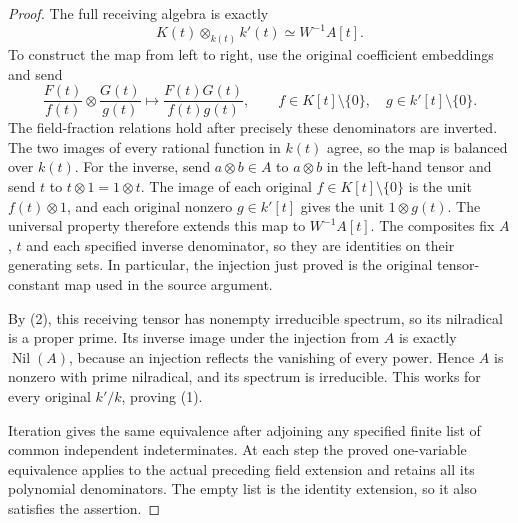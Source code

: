 \begin{proof}
The full receiving algebra is
exactly
$$
K(t)\otimes_{k(t)}k'(t)\simeq W^{-1}A[t].
$$
To construct the map from left
to right, use the original
coefficient embeddings and send
$$
\frac{F(t)}{f(t)}\otimes\frac{G(t)}{g(t)}
\longmapsto\frac{F(t)G(t)}{f(t)g(t)},
\qquad
f\in K[t]\setminus\{0\},\quad
g\in k'[t]\setminus\{0\}.
$$
The field-fraction relations hold
after precisely these denominators
are inverted. The two images of
every rational function in $k(t)$
agree, so the map is balanced over
$k(t)$. For the inverse, send
$a\otimes b\in A$ to $a\otimes b$
in the left-hand tensor and send
$t$ to $t\otimes1=1\otimes t$.
The image of each original
$f\in K[t]\setminus\{0\}$ is
the unit $f(t)\otimes1$, and
each original nonzero $g\in k'[t]$
gives the unit $1\otimes g(t)$.
The universal property therefore
extends this map to $W^{-1}A[t]$.
The composites fix $A$, $t$ and
each specified inverse denominator,
so they are identities on their
generating sets. In particular,
the injection just proved is
the original tensor-constant map
used in the source argument.

By (2), this receiving tensor
has nonempty irreducible spectrum,
so its nilradical is a proper
prime. Its inverse image under
the injection from $A$ is exactly
$\operatorname{Nil}(A)$, because
an injection reflects the vanishing
of every power. Hence $A$ is
nonzero with prime nilradical,
and its spectrum is irreducible.
This works for every original
$k'/k$, proving (1).

Iteration gives the same equivalence
after adjoining any specified finite
list of common independent
indeterminates. At each step the
proved one-variable equivalence
applies to the actual preceding
field extension and retains all
its polynomial denominators.
The empty list is the identity
extension, so it also satisfies
the assertion.
\end{proof}